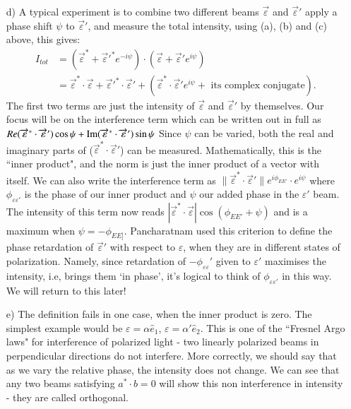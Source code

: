 \begin{itemize}
\item[d)] A typical experiment is to combine two different beams $\overrightarrow{\varepsilon}$ and $\overrightarrow{\varepsilon}'$ apply a phase
shift $\psi$ to $\overrightarrow{\varepsilon}'$, and measure the total intensity, using (a), (b) and (c) above, this
gives:
\begin{align*}
I_{tot} & = (\overrightarrow{\varepsilon}^{\ast} + \overrightarrow{\varepsilon}'^{\ast} e^{-i\psi})  \cdot (\overrightarrow{\varepsilon} + \overrightarrow{\varepsilon}' e^{i\psi})\\
& = \overrightarrow{\varepsilon}^{\ast} \cdot \overrightarrow{\varepsilon} + \overrightarrow{\varepsilon}'^{\ast}  \cdot \overrightarrow{\varepsilon}' + (\overrightarrow{\varepsilon}^{\ast} \cdot \overrightarrow{\varepsilon}' e^{i\psi}  + \text{ its complex conjugate}).
\end{align*}
The first two terms are just the intensity of $\overrightarrow{\varepsilon}$ and $\overrightarrow{\varepsilon}'$ by themselves. Our focus will be on the interference term which can be written out in full as $Re(\overrightarrow{\varepsilon}^{\ast}  \cdot \overrightarrow{\varepsilon}') \cos \psi + \operatorname{\mathrm{Im}} (\overrightarrow{\varepsilon}^{\ast} \cdot \overrightarrow{\varepsilon}') \sin \psi$
Since $\psi$ can be varied, both the real and imaginary parts of ($\overrightarrow{\varepsilon}^{\ast} \cdot \overrightarrow{\varepsilon}'$) can be
measured. Mathematically, this is the ``inner product", and the norm is just
the inner product of a vector with itself. We can also write the interference
term as $\| \overrightarrow{\varepsilon}^{\ast}  \cdot \overrightarrow{\varepsilon}'\| e^{i\phi_{EE'}} \cdot e^{i\psi}$ where $\phi_{\varepsilon \varepsilon'}$ is the phase of our inner product and $\psi$ our added phase in the $\varepsilon'$ beam. The intensity of this term now reads
$| \overrightarrow{\varepsilon}^{\ast} \cdot \overrightarrow{\varepsilon}| \cos (\phi_{EE'} + \psi)$ and is a maximum when $\psi = -\phi_{EE]}$. Pancharatnam
used this criterion to define the phase retardation of $\overrightarrow{\varepsilon}'$ with respect to $\varepsilon$, when
they are in different states of polarization. Namely, since retardation of $-\phi_{\varepsilon \varepsilon}'$ 
given to $\varepsilon'$ maximises the intensity, i.e, brings them `in phase', it's logical to
think of $\phi_{\varepsilon \varepsilon'}$ in this way. We will return to this later!

\item[e)] The definition fails in one case, when the inner product is zero. The simplest
example would be $\varepsilon = \alpha \hat{e}_1$, $\varepsilon = \alpha' \hat{e}_2$. This is one of the ``Fresnel Argo laws" for
interference of polarized light - two linearly polarized beams in perpendicular
directions do not interfere. More correctly, we should say that as we vary the
relative phase, the intensity does not change. We can see that any two beams
satisfying $a^{\ast} \cdot b = 0$ will show this non interference in intensity - they are called
orthogonal.


\end{itemize}
